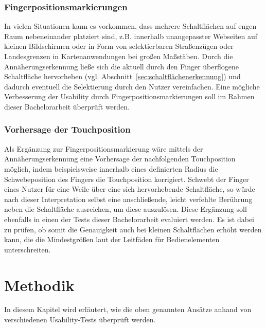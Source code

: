 \documentclass[12pt,bibliography=totocnumbered,listof=totocnumbered,abstracton]{scrreprt}
\begin{document}
\subsection{Fingerpositionsmarkierungen}
In vielen Situationen kann es vorkommen, dass mehrere Schaltflächen auf engen Raum nebeneinander platziert sind, z.B. innerhalb unangepasster Webseiten auf kleinen Bildschirmen oder in Form von selektierbaren Straßenzügen oder Landesgrenzen in Kartenanwendungen bei großen Maßstäben. Durch die Annäherungserkennung ließe sich die aktuell durch den Finger überflogene Schaltfläche hervorheben (vgl. Abschnitt~\ref{sec:schaltflächenerkennung}) und dadurch eventuell die Selektierung durch den Nutzer vereinfachen. Eine mögliche Verbesserung der Usability durch Fingerpositionsmarkierungen soll im Rahmen dieser Bachelorarbeit überprüft werden.

\subsection{Vorhersage der Touchposition}
Als Ergänzung zur Fingerpositionsmarkierung wäre mittels der Annäherungserkennung eine Vorhersage der nachfolgenden Touchposition möglich, indem beispielsweise innerhalb eines definierten Radius die Schwebeposition des Fingers die Touchposition korrigiert. Schwebt der Finger eines Nutzer für eine Weile über eine sich hervorhebende Schaltfläche, so würde nach dieser Interpretation selbst eine anschließende, leicht verfehlte Berührung neben die Schaltfläche ausreichen, um diese auszulösen. Diese Ergänzung soll ebenfalls in einen der Tests dieser Bachelorarbeit evaluiert werden. Es ist dabei zu prüfen, ob somit die Genauigkeit auch bei kleinen Schaltflächen erhöht werden kann, die die Mindestgrößen laut der Leitfäden für Bedienelementen unterschreiten.

\chapter{Methodik}
In diesem Kapitel wird erläutert, wie die oben genannten Ansätze anhand von verschiedenen Usability-Tests überprüft werden.
\end{document}
